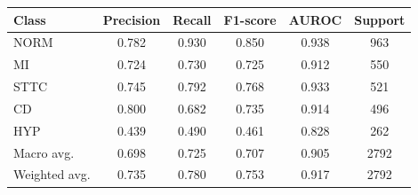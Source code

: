 \begin{tabular}{@{}lccccc@{}}
\toprule
Class & Precision & Recall & F1-score & AUROC & Support \\
\midrule
NORM & 0.782 & 0.930 & 0.850 & 0.938 & 963 \\
MI & 0.724 & 0.730 & 0.725 & 0.912 & 550 \\
STTC & 0.745 & 0.792 & 0.768 & 0.933 & 521 \\
CD & 0.800 & 0.682 & 0.735 & 0.914 & 496 \\
HYP & 0.439 & 0.490 & 0.461 & 0.828 & 262 \\
\midrule
Macro avg. & 0.698 & 0.725 & 0.707 & 0.905 & 2792 \\
Weighted avg. & 0.735 & 0.780 & 0.753 & 0.917 & 2792 \\
\bottomrule
\end{tabular}
